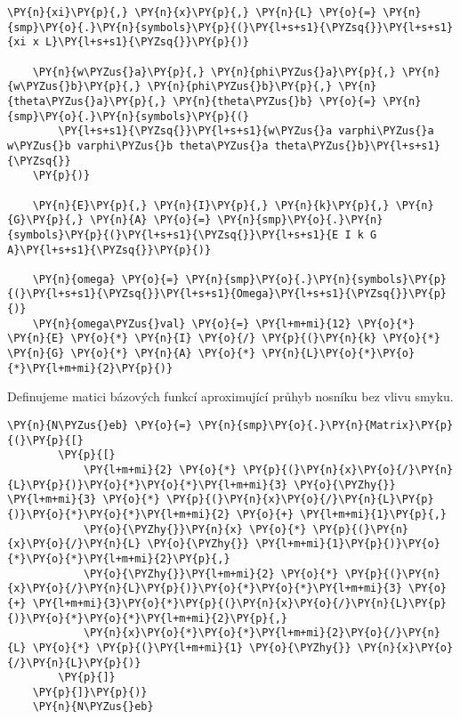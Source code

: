 \begin{tcolorbox}[breakable, size=fbox, boxrule=1pt, pad at break*=1mm,colback=cellbackground, colframe=cellborder]
    \begin{Verbatim}[commandchars=\\\{\}]
    \PY{n}{xi}\PY{p}{,} \PY{n}{x}\PY{p}{,} \PY{n}{L} \PY{o}{=} \PY{n}{smp}\PY{o}{.}\PY{n}{symbols}\PY{p}{(}\PY{l+s+s1}{\PYZsq{}}\PY{l+s+s1}{xi x L}\PY{l+s+s1}{\PYZsq{}}\PY{p}{)}
    
    \PY{n}{w\PYZus{}a}\PY{p}{,} \PY{n}{phi\PYZus{}a}\PY{p}{,} \PY{n}{w\PYZus{}b}\PY{p}{,} \PY{n}{phi\PYZus{}b}\PY{p}{,} \PY{n}{theta\PYZus{}a}\PY{p}{,} \PY{n}{theta\PYZus{}b} \PY{o}{=} \PY{n}{smp}\PY{o}{.}\PY{n}{symbols}\PY{p}{(}
        \PY{l+s+s1}{\PYZsq{}}\PY{l+s+s1}{w\PYZus{}a varphi\PYZus{}a w\PYZus{}b varphi\PYZus{}b theta\PYZus{}a theta\PYZus{}b}\PY{l+s+s1}{\PYZsq{}}
    \PY{p}{)}
    
    \PY{n}{E}\PY{p}{,} \PY{n}{I}\PY{p}{,} \PY{n}{k}\PY{p}{,} \PY{n}{G}\PY{p}{,} \PY{n}{A} \PY{o}{=} \PY{n}{smp}\PY{o}{.}\PY{n}{symbols}\PY{p}{(}\PY{l+s+s1}{\PYZsq{}}\PY{l+s+s1}{E I k G A}\PY{l+s+s1}{\PYZsq{}}\PY{p}{)}
    
    \PY{n}{omega} \PY{o}{=} \PY{n}{smp}\PY{o}{.}\PY{n}{symbols}\PY{p}{(}\PY{l+s+s1}{\PYZsq{}}\PY{l+s+s1}{Omega}\PY{l+s+s1}{\PYZsq{}}\PY{p}{)}
    \PY{n}{omega\PYZus{}val} \PY{o}{=} \PY{l+m+mi}{12} \PY{o}{*} \PY{n}{E} \PY{o}{*} \PY{n}{I} \PY{o}{/} \PY{p}{(}\PY{n}{k} \PY{o}{*} \PY{n}{G} \PY{o}{*} \PY{n}{A} \PY{o}{*} \PY{n}{L}\PY{o}{*}\PY{o}{*}\PY{l+m+mi}{2}\PY{p}{)}
    \end{Verbatim}
\end{tcolorbox}
 

Definujeme matici bázových funkcí aproximující průhyb nosníku bez vlivu smyku.
\begin{tcolorbox}[breakable, size=fbox, boxrule=1pt, pad at break*=1mm,colback=cellbackground, colframe=cellborder]
    \begin{Verbatim}[commandchars=\\\{\}]
    \PY{n}{N\PYZus{}eb} \PY{o}{=} \PY{n}{smp}\PY{o}{.}\PY{n}{Matrix}\PY{p}{(}\PY{p}{[}
        \PY{p}{[}
            \PY{l+m+mi}{2} \PY{o}{*} \PY{p}{(}\PY{n}{x}\PY{o}{/}\PY{n}{L}\PY{p}{)}\PY{o}{*}\PY{o}{*}\PY{l+m+mi}{3} \PY{o}{\PYZhy{}} \PY{l+m+mi}{3} \PY{o}{*} \PY{p}{(}\PY{n}{x}\PY{o}{/}\PY{n}{L}\PY{p}{)}\PY{o}{*}\PY{o}{*}\PY{l+m+mi}{2} \PY{o}{+} \PY{l+m+mi}{1}\PY{p}{,}
            \PY{o}{\PYZhy{}}\PY{n}{x} \PY{o}{*} \PY{p}{(}\PY{n}{x}\PY{o}{/}\PY{n}{L} \PY{o}{\PYZhy{}} \PY{l+m+mi}{1}\PY{p}{)}\PY{o}{*}\PY{o}{*}\PY{l+m+mi}{2}\PY{p}{,}
            \PY{o}{\PYZhy{}}\PY{l+m+mi}{2} \PY{o}{*} \PY{p}{(}\PY{n}{x}\PY{o}{/}\PY{n}{L}\PY{p}{)}\PY{o}{*}\PY{o}{*}\PY{l+m+mi}{3} \PY{o}{+} \PY{l+m+mi}{3}\PY{o}{*}\PY{p}{(}\PY{n}{x}\PY{o}{/}\PY{n}{L}\PY{p}{)}\PY{o}{*}\PY{o}{*}\PY{l+m+mi}{2}\PY{p}{,}
            \PY{n}{x}\PY{o}{*}\PY{o}{*}\PY{l+m+mi}{2}\PY{o}{/}\PY{n}{L} \PY{o}{*} \PY{p}{(}\PY{l+m+mi}{1} \PY{o}{\PYZhy{}} \PY{n}{x}\PY{o}{/}\PY{n}{L}\PY{p}{)}
        \PY{p}{]}
    \PY{p}{]}\PY{p}{)}
    \PY{n}{N\PYZus{}eb}
    \end{Verbatim}
\end{tcolorbox}
            
